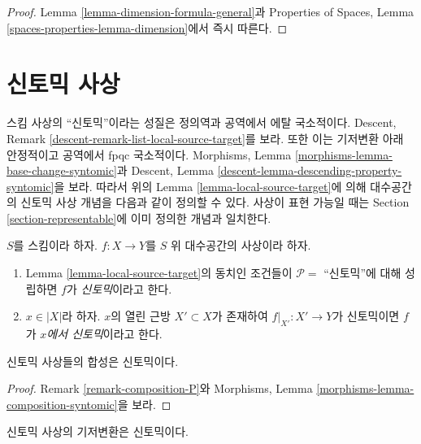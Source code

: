 \begin{proof}
Lemma \ref{lemma-dimension-formula-general}과 Properties of Spaces,
Lemma \ref{spaces-properties-lemma-dimension}에서 즉시 따른다.
\end{proof}







\section{신토믹 사상}
\label{section-syntomic}

\noindent
스킴 사상의 “신토믹”이라는 성질은 정의역과 공역에서 에탈
국소적이다. Descent, Remark
\ref{descent-remark-list-local-source-target}를 보라.
또한 이는 기저변환 아래 안정적이고 공역에서 fpqc 국소적이다.
Morphisms, Lemma \ref{morphisms-lemma-base-change-syntomic}과
Descent, Lemma \ref{descent-lemma-descending-property-syntomic}을 보라.
따라서 위의 Lemma \ref{lemma-local-source-target}에 의해 대수공간의
신토믹 사상 개념을 다음과 같이 정의할 수 있다. 사상이 표현 가능일
때는 Section \ref{section-representable}에 이미 정의한 개념과 일치한다.

\begin{definition}
\label{definition-syntomic}
$S$를 스킴이라 하자.
$f : X \to Y$를 $S$ 위 대수공간의 사상이라 하자.
\begin{enumerate}
\item Lemma \ref{lemma-local-source-target}의 동치인 조건들이
$\mathcal{P} =$ “신토믹”에 대해 성립하면 $f$가 {\it 신토믹}이라고 한다.
\item $x \in |X|$라 하자. $x$의 열린 근방 $X' \subset X$가 존재하여
$f|_{X'} : X' \to Y$가 신토믹이면 $f$가
{\it $x$에서 신토믹}이라고 한다.
\end{enumerate}
\end{definition}

\begin{lemma}
\label{lemma-composition-syntomic}
신토믹 사상들의 합성은 신토믹이다.
\end{lemma}

\begin{proof}
Remark \ref{remark-composition-P}와 Morphisms, Lemma
\ref{morphisms-lemma-composition-syntomic}을 보라.
\end{proof}

\begin{lemma}
\label{lemma-base-change-syntomic}
신토믹 사상의 기저변환은 신토믹이다.
\end{lemma}

